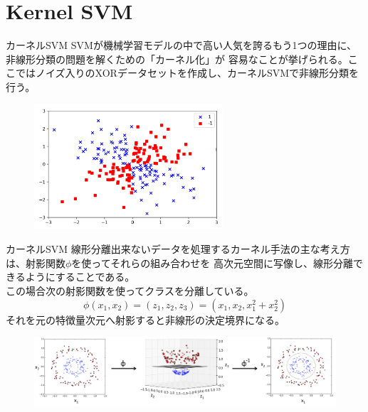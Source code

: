 \documentclass[aspectratio=169, dvipdfmx, 11pt]{beamer} %
\begin{document}
\section{Kernel SVM}
\begin{frame}{カーネルSVM}
    SVMが機械学習モデルの中で高い人気を誇るもう1つの理由に、非線形分類の問題を解くための「カーネル化」が
    容易なことが挙げられる。ここではノイズ入りのXORデータセットを作成し、カーネルSVMで非線形分類を行う。
    \begin{figure}[b]
        \begin{center}
        \includegraphics[width=70mm]{img/day02/fig07.png}
        \end{center}
    \end{figure}
\end{frame}

\begin{frame}{カーネルSVM}
    線形分離出来ないデータを処理するカーネル手法の主な考え方は、射影関数\(\phi\)を使ってそれらの組み合わせを
    高次元空間に写像し、線形分離できるようにすることである。\\
    この場合次の射影関数を使ってクラスを分離している。
    \begin{equation*}
        \phi(x_1, x_2) = (z_1, z_2, z_3) = (x_1, x_2, x_{1}^{2}+x_{2}^{2})
    \end{equation*}
    それを元の特徴量次元へ射影すると非線形の決定境界になる。
    \begin{figure}[b]
        \begin{center}
        \includegraphics[width=150mm]{img/day02/fig08.png}
        \end{center}
    \end{figure}
\end{frame}
\end{document}
